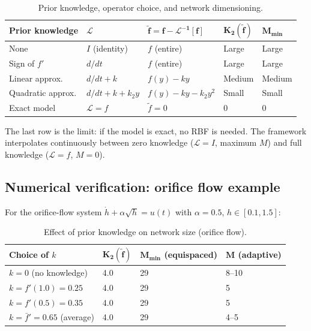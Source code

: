 \documentclass[11pt,a4paper]{article}
\begin{document}
\begin{table}[H]
\centering
\caption{Prior knowledge, operator choice, and network dimensioning.}
\label{tab:prior}
\begin{tabular}{L{2.8cm} L{2.5cm} L{2.8cm} C{1.3cm} C{1.3cm}}
\toprule
\textbf{Prior knowledge} & $\boldsymbol{\mathcal{L}}$ & $\boldsymbol{\tilde{f} = f - \mathcal{L}^{-1}[f]}$ & $\boldsymbol{K_2(\tilde{f})}$ & $\boldsymbol{M_{\min}}$ \\
\midrule
None & $I$ (identity) & $f$ (entire) & Large & Large \\
Sign of $f'$ & $d/dt$ & $f$ (entire) & Large & Large \\
Linear approx. & $d/dt + k$ & $f(y) - ky$ & Medium & Medium \\
Quadratic approx. & $d/dt + k + k_2 y$ & $f(y) - ky - k_2 y^2$ & Small & Small \\
Exact model & $\mathcal{L} = f$ & $\tilde{f} = 0$ & $0$ & $0$ \\
\bottomrule
\end{tabular}
\end{table}

The last row is the limit: if the model is exact, no RBF is needed. The framework interpolates continuously between zero knowledge ($\mathcal{L} = I$, maximum $M$) and full knowledge ($\mathcal{L} = f$, $M = 0$).

\subsection{Numerical verification: orifice flow example}

For the orifice-flow system $\dot{h} + \alpha\sqrt{h} = u(t)$ with $\alpha = 0.5$, $h \in [0.1, 1.5]$:

\begin{table}[H]
\centering
\caption{Effect of prior knowledge on network size (orifice flow).}
\label{tab:prior-numeric}
\begin{tabular}{L{3.5cm} C{1.5cm} C{2.5cm} C{2.5cm}}
\toprule
\textbf{Choice of $k$} & $\boldsymbol{K_2(\tilde{f})}$ & $\boldsymbol{M_{\min}}$ \textbf{(equispaced)} & $\boldsymbol{M}$ \textbf{(adaptive)} \\
\midrule
$k = 0$ (no knowledge) & 4.0 & 29 & 8--10 \\
$k = f'(1.0) = 0.25$ & 4.0 & 29 & 5 \\
$k = f'(0.5) = 0.35$ & 4.0 & 29 & 5 \\
$k = \bar{f}' = 0.65$ (average) & 4.0 & 29 & 4--5 \\
\bottomrule
\end{tabular}
\end{table}
\end{document}
